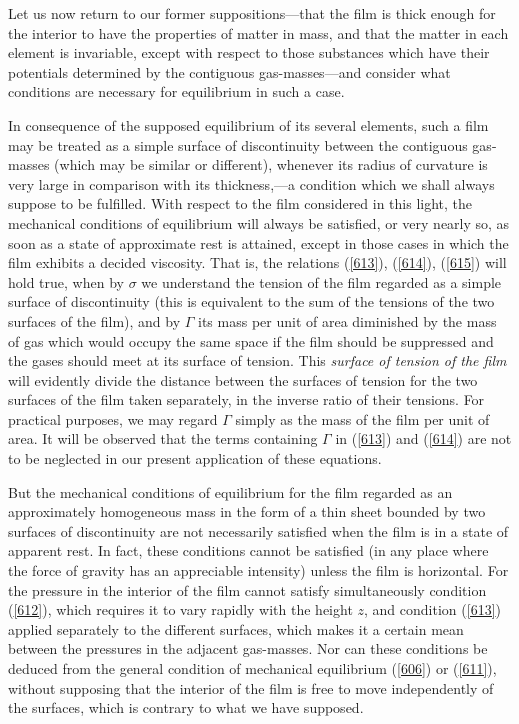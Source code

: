 \documentclass[12pt]{article}
\begin{document}
Let us now return to our former suppositions---that the film is thick enough for the interior to have the properties of matter in mass, and that the matter in each element is invariable, except with respect to those substances which have their potentials determined by the contiguous gas-masses---and consider what conditions are necessary for equilibrium in such a case.

In consequence of the supposed equilibrium of its several elements, such a film may be treated as a simple surface of discontinuity between the contiguous gas-masses (which may be similar or different), whenever its radius of curvature is very large in comparison with its thickness,---a condition which we shall always suppose to be fulfilled. With respect to the film considered in this light, the mechanical conditions of equilibrium will always be satisfied, or very nearly so, as soon as a state of approximate rest is attained, except in those cases in which the film exhibits a decided viscosity. That is, the relations (\ref{613}), (\ref{614}), (\ref{615}) will hold true, when by $\sigma$ we understand the tension of the film regarded as a simple surface of discontinuity (this is equivalent to the sum of the tensions of the two surfaces of the film), and by $\Gamma$ its mass per unit of area diminished by the mass of gas which would occupy the same space if the film should be suppressed and the gases should meet at its surface of tension. This \textit{surface of tension of the film} will evidently divide the distance between the surfaces of tension for the two surfaces of the film taken separately, in the inverse ratio of their tensions. For practical purposes, we may regard $\Gamma$ simply as the mass of the film per unit of area. It will be observed that the terms containing $\Gamma$ in (\ref{613}) and (\ref{614}) are not to be neglected in our present application of these equations.

But the mechanical conditions of equilibrium for the film regarded as an approximately homogeneous mass in the form of a thin sheet bounded by two surfaces of discontinuity are not necessarily satisfied when the film is in a state of apparent rest. In fact, these conditions cannot be satisfied (in any place where the force of gravity has an appreciable intensity) unless the film is horizontal. For the pressure in the interior of the film cannot satisfy simultaneously condition (\ref{612}), which requires it to vary rapidly with the height $z$, and condition (\ref{613}) applied separately to the different surfaces, which makes it a certain mean between the pressures in the adjacent gas-masses. Nor can these conditions be deduced from the general condition of mechanical equilibrium (\ref{606}) or (\ref{611}), without supposing that the interior of the film is free to move independently of the surfaces, which is contrary to what we have supposed.
\end{document}
